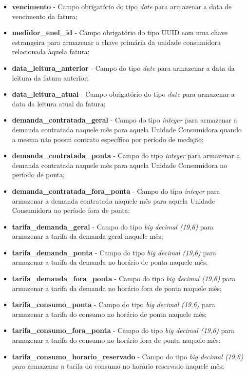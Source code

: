 \begin{itemize}
    \item \textbf{vencimento} - Campo obrigatório do tipo \textit{date} para armazenar a data de vencimento da fatura;
    \item \textbf{medidor\_enel\_id} - Campo obrigatório do tipo UUID com uma chave estrangeira para armazenar a chave primária da unidade consumidora relacionada àquela fatura;
    \item \textbf{data\_leitura\_anterior} - Campo do tipo \textit{date} para armazenar a data da leitura da fatura anterior;
    \item \textbf{data\_leitura\_atual} - Campo obrigatório do tipo \textit{date} para armazenar a data da leitura atual da fatura;
    \item \textbf{demanda\_contratada\_geral} - Campo do tipo \textit{integer} para armazenar a demanda contratada naquele mês para aquela Unidade Consumidora quando a mesma não possui contrato específico por período de medição;
    \item \textbf{demanda\_contratada\_ponta} - Campo do tipo \textit{integer} para armazenar a demanda contratada naquele mês para aquela Unidade Consumidora no período de ponta;
    \item \textbf{demanda\_contratada\_fora\_ponta} - Campo do tipo \textit{integer} para armazenar a demanda contratada naquele mês para aquela Unidade Consumidora no período fora de ponta;
    \item \textbf{tarifa\_demanda\_geral} - Campo do tipo \textit{big decimal (19,6)} para armazenar a tarifa da demanda geral naquele mês;
    \item \textbf{tarifa\_demanda\_ponta} - Campo do tipo \textit{big decimal (19,6)} para armazenar a tarifa da demanda no horário de ponta naquele mês;
    \item \textbf{tarifa\_demanda\_fora\_ponta} - Campo do tipo \textit{big decimal (19,6)} para armazenar a tarifa da demanda no horário fora de ponta naquele mês;
    \item \textbf{tarifa\_consumo\_ponta} - Campo do tipo \textit{big decimal (19,6)} para armazenar a tarifa do consumo no horário de ponta naquele mês;
    \item \textbf{tarifa\_consumo\_fora\_ponta} - Campo do tipo \textit{big decimal (19,6)} para armazenar a tarifa do consumo no horário fora de ponta naquele mês;
    \item \textbf{tarifa\_consumo\_horario\_reservado} - Campo do tipo \textit{big decimal (19,6)} para armazenar a tarifa do consumo no horário reservado naquele mês;

\end{itemize}
